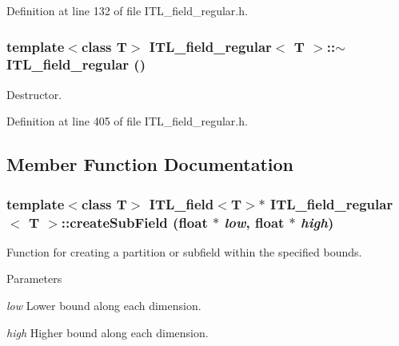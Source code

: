 Definition at line 132 of file ITL\_\-field\_\-regular.h.

\hypertarget{classITL__field__regular_a61df91153315ad7033658ab3fe811c25}{
\subsubsection[{$\sim$ITL\_\-field\_\-regular}]{\setlength{\rightskip}{0pt plus 5cm}template$<$class T$>$ {\bf ITL\_\-field\_\-regular}$<$ T $>$::$\sim${\bf ITL\_\-field\_\-regular} ()}}
\label{classITL__field__regular_a61df91153315ad7033658ab3fe811c25}


Destructor. 



Definition at line 405 of file ITL\_\-field\_\-regular.h.



\subsection{Member Function Documentation}
\hypertarget{classITL__field__regular_a600a5a99a3e696c3a6698f112933a90c}{
\subsubsection[{createSubField}]{\setlength{\rightskip}{0pt plus 5cm}template$<$class T$>$ {\bf ITL\_\-field}$<$T$>$$\ast$ {\bf ITL\_\-field\_\-regular}$<$ T $>$::createSubField (float $\ast$ {\em low}, \/  float $\ast$ {\em high})}}
\label{classITL__field__regular_a600a5a99a3e696c3a6698f112933a90c}


Function for creating a partition or subfield within the specified bounds. 


\begin{DoxyParams}{Parameters}
\item[{\em low}]Lower bound along each dimension. \item[{\em high}]Higher bound along each dimension. \end{DoxyParams}



